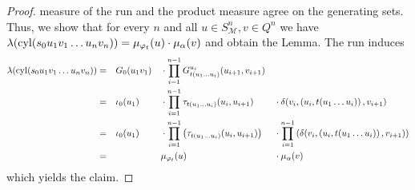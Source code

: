 \begin{proof}
  measure of the run and the product measure agree on the generating sets.
  Thus, we show that for every $n$ and all $u\in S_{\mathcal{M}}^{n},
  v\in Q^{n}$ we have $\lambda(\operatorname{cyl}(s_{0}u_{1}v_{1}\dots u_{n}v_{n})) =
  \mu_{\varphi_{t}}(u)\cdot\mu_{\alpha}(v)$ and obtain the Lemma. The run
  induces
  \begin{alignat*}{4}
    \lambda(\operatorname{cyl}(s_{0}u_{1}v_{1}\dots u_{n}v_{n})) &=&
    &G_{0}(u_{1}v_{1})&&\cdot\prod\limits_{i = 1}^{n-1}
    G^{u_{i}}_{t(u_{1}\dots u_{i})}(u_{i+1}, v_{i+1})&&\\
    &=&&\iota_{0}(u_{1})&&\cdot\prod\limits_{i = 1}^{n-1}
    \tau_{t(u_{1}\dots u_{i})}(u_{i}, u_{i+1})&&\cdot
    \delta(v_{i}, \left(u_{i}, t(u_{1}\dots u_{i})\right), v_{i+1})\\
    &=&&\iota_{0}(u_{1})&&\cdot\prod\limits_{i = 1}^{n-1}\left(
      \tau_{t(u_{1}\dots u_{i})}(u_{i}, u_{i+1})\right)
    &&\cdot\prod\limits_{i = 1}^{n-1}\left(
      \delta(v_{i}, \left(u_{i}, t(u_{1}\dots u_{i})\right), v_{i+1})\right)\\
    &=&&&&\mu_{\varphi_{t}}(u)&&\cdot\mu_{\alpha}(v)
  \end{alignat*}
  which yields the claim.
\end{proof}
